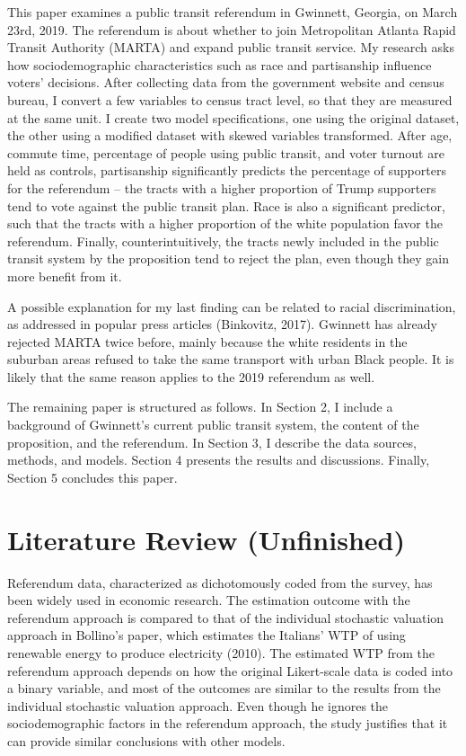 \documentclass[
]{article}
\begin{document}
This paper examines a public transit referendum in Gwinnett, Georgia, on
March 23rd, 2019. The referendum is about whether to join Metropolitan
Atlanta Rapid Transit Authority (MARTA) and expand public transit
service. My research asks how sociodemographic characteristics such as
race and partisanship influence voters' decisions. After collecting data
from the government website and census bureau, I convert a few variables
to census tract level, so that they are measured at the same unit. I
create two model specifications, one using the original dataset, the
other using a modified dataset with skewed variables transformed. After
age, commute time, percentage of people using public transit, and voter
turnout are held as controls, partisanship significantly predicts the
percentage of supporters for the referendum -- the tracts with a higher
proportion of Trump supporters tend to vote against the public transit
plan. Race is also a significant predictor, such that the tracts with a
higher proportion of the white population favor the referendum. Finally,
counterintuitively, the tracts newly included in the public transit
system by the proposition tend to reject the plan, even though they gain
more benefit from it.

A possible explanation for my last finding can be related to racial
discrimination, as addressed in popular press articles (Binkovitz,
2017). Gwinnett has already rejected MARTA twice before, mainly because
the white residents in the suburban areas refused to take the same
transport with urban Black people. It is likely that the same reason
applies to the 2019 referendum as well.

The remaining paper is structured as follows. In Section 2, I include a
background of Gwinnett's current public transit system, the content of
the proposition, and the referendum. In Section 3, I describe the data
sources, methods, and models. Section 4 presents the results and
discussions. Finally, Section 5 concludes this paper.

\hypertarget{literature-review-unfinished}{%
\section{Literature Review
(Unfinished)}\label{literature-review-unfinished}}

Referendum data, characterized as dichotomously coded from the survey,
has been widely used in economic research. The estimation outcome with
the referendum approach is compared to that of the individual stochastic
valuation approach in Bollino's paper, which estimates the Italians' WTP
of using renewable energy to produce electricity (2010). The estimated
WTP from the referendum approach depends on how the original
Likert-scale data is coded into a binary variable, and most of the
outcomes are similar to the results from the individual stochastic
valuation approach. Even though he ignores the sociodemographic factors
in the referendum approach, the study justifies that it can provide
similar conclusions with other models.
\end{document}
